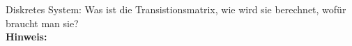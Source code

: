 \begin{question}[section=6,name={Transistionsmatrix},difficulty=,type=mdl,tags={}]
	Diskretes System: Was ist die Transistionsmatrix, wie wird sie berechnet, wofür braucht man sie?
	\\ \textbf{Hinweis:}\\
	
\end{question}
\begin{solution}
	
\end{solution}